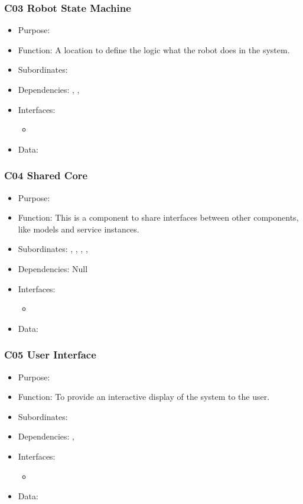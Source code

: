 \subsubsection{C03 Robot State Machine} \label{compState}
\begin{itemize}
	\item Purpose: 
	\item Function: A location to define the logic what the robot does in the system.
	\item Subordinates: 
	\item Dependencies: , , 
	\item Interfaces:
	\begin{itemize}
		\item
	\end{itemize}
	\item Data:
\end{itemize}

\subsubsection{C04 Shared Core} \label{compShared}
\begin{itemize}
	\item Purpose: 
	\item Function: This is a component to share interfaces between other components, like models and service instances.
	\item Subordinates: , , , , 
	\item Dependencies: Null
	\item Interfaces:
	\begin{itemize}
		\item
	\end{itemize}
	\item Data:
\end{itemize}

\subsubsection{C05 User Interface} \label{compUI}
\begin{itemize}
	\item Purpose: 
	\item Function: To provide an interactive display of the system to the user. 
	\item Subordinates: 
	\item Dependencies: , 
	\item Interfaces:
	\begin{itemize}
		\item
	\end{itemize}
	\item Data:
\end{itemize}

